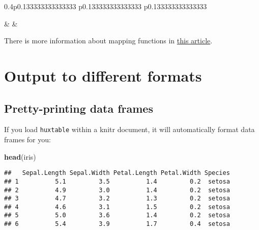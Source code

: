 \documentclass[]{article}
\newenvironment{Shaded}{\begin{snugshade}}{\end{snugshade}}
\newcommand{\KeywordTok}[1]{\textcolor[rgb]{0.13,0.29,0.53}{\textbf{#1}}}
\newcommand{\NormalTok}[1]{#1}
\begin{document}
\begin{table}[ht]
\begin{centerbox}
\begin{threeparttable}
\begin{tabularx}{0.4\textwidth}{p{} p{} p{}}
\hhline{}

 &
 &
 \tabularnewline[-0.5pt]


\hhline{}
\end{tabularx}
\end{threeparttable}\par\end{centerbox}

\end{table}
 

\FloatBarrier

There is more information about mapping functions in
\href{https://hughjonesd.github.io/reporting-data-with-huxtable-4.3.0.html}{this
article}.

\hypertarget{output-to-different-formats}{%
\section{Output to different
formats}\label{output-to-different-formats}}

\hypertarget{pretty-printing-data-frames}{%
\subsection{Pretty-printing data
frames}\label{pretty-printing-data-frames}}

If you load \texttt{huxtable} within a knitr document, it will
automatically format data frames for you:

\begin{Shaded}
\begin{Highlighting}[]
\KeywordTok{head}\NormalTok{(iris)}
\end{Highlighting}
\end{Shaded}

\begin{verbatim}
##   Sepal.Length Sepal.Width Petal.Length Petal.Width Species
## 1          5.1         3.5          1.4         0.2  setosa
## 2          4.9         3.0          1.4         0.2  setosa
## 3          4.7         3.2          1.3         0.2  setosa
## 4          4.6         3.1          1.5         0.2  setosa
## 5          5.0         3.6          1.4         0.2  setosa
## 6          5.4         3.9          1.7         0.4  setosa
\end{verbatim}
\end{document}
